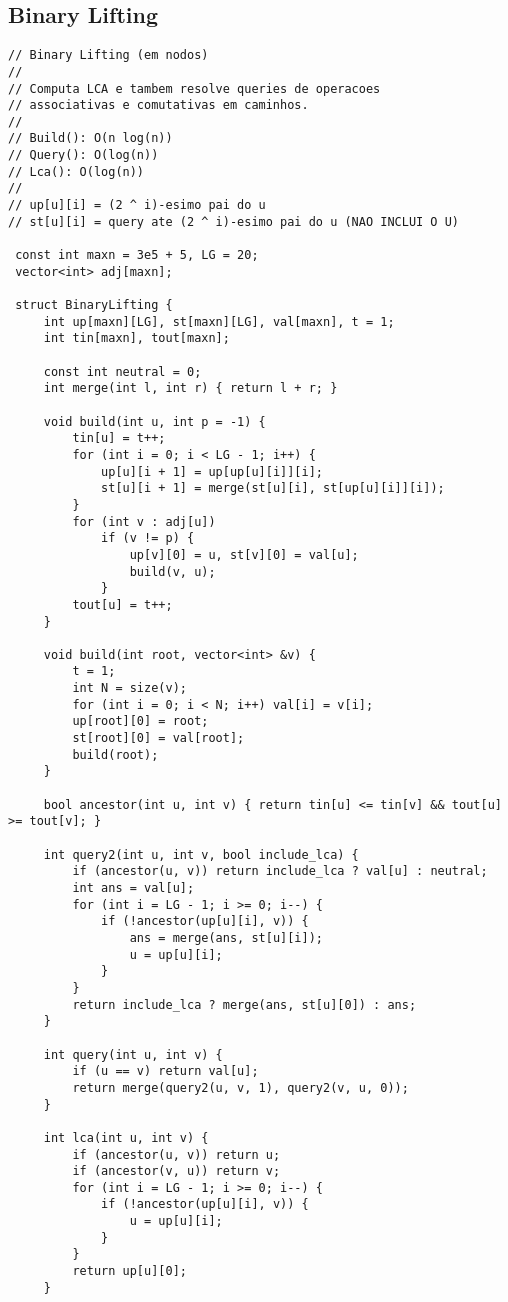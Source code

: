 \documentclass[11pt, a4paper, twoside]{article}
\begin{document}
\subsection{Binary Lifting}
\begin{lstlisting}
// Binary Lifting (em nodos)
//
// Computa LCA e tambem resolve queries de operacoes
// associativas e comutativas em caminhos.
//
// Build(): O(n log(n))
// Query(): O(log(n))
// Lca(): O(log(n))
//
// up[u][i] = (2 ^ i)-esimo pai do u
// st[u][i] = query ate (2 ^ i)-esimo pai do u (NAO INCLUI O U)

 const int maxn = 3e5 + 5, LG = 20;
 vector<int> adj[maxn];
 
 struct BinaryLifting {
     int up[maxn][LG], st[maxn][LG], val[maxn], t = 1;
     int tin[maxn], tout[maxn];
 
     const int neutral = 0;
     int merge(int l, int r) { return l + r; }
 
     void build(int u, int p = -1) {
         tin[u] = t++;
         for (int i = 0; i < LG - 1; i++) {
             up[u][i + 1] = up[up[u][i]][i];
             st[u][i + 1] = merge(st[u][i], st[up[u][i]][i]);
         }
         for (int v : adj[u])
             if (v != p) {
                 up[v][0] = u, st[v][0] = val[u];
                 build(v, u);
             }
         tout[u] = t++;
     }
 
     void build(int root, vector<int> &v) {
         t = 1;
         int N = size(v);
         for (int i = 0; i < N; i++) val[i] = v[i];
         up[root][0] = root;
         st[root][0] = val[root];
         build(root);
     }
 
     bool ancestor(int u, int v) { return tin[u] <= tin[v] && tout[u] >= tout[v]; }
 
     int query2(int u, int v, bool include_lca) {
         if (ancestor(u, v)) return include_lca ? val[u] : neutral;
         int ans = val[u];
         for (int i = LG - 1; i >= 0; i--) {
             if (!ancestor(up[u][i], v)) {
                 ans = merge(ans, st[u][i]);
                 u = up[u][i];
             }
         }
         return include_lca ? merge(ans, st[u][0]) : ans;
     }
 
     int query(int u, int v) {
         if (u == v) return val[u];
         return merge(query2(u, v, 1), query2(v, u, 0));
     }
 
     int lca(int u, int v) {
         if (ancestor(u, v)) return u;
         if (ancestor(v, u)) return v;
         for (int i = LG - 1; i >= 0; i--) {
             if (!ancestor(up[u][i], v)) {
                 u = up[u][i];
             }
         }
         return up[u][0];
     }
 

\end{lstlisting}
\end{document}
